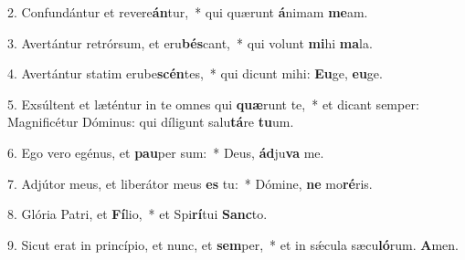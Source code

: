 2. Confundántur et revere\textbf{án}tur,~*  qui quærunt \textbf{á}nimam \textbf{me}am.\

3. Avertántur retrórsum, et eru\textbf{bés}cant,~*  qui volunt \textbf{mi}hi \textbf{ma}la.\

4. Avertántur statim erube\textbf{scén}tes,~*  qui dicunt mihi: \textbf{Eu}ge, \textbf{eu}ge.\

5. Exsúltent et læténtur in te omnes qui \textbf{quæ}runt te,~*  et dicant semper: Magnificétur Dóminus: qui díligunt salu\textbf{tá}re \textbf{tu}um.\

6. Ego vero egénus, et \textbf{pau}per sum:~*  Deus, \textbf{ád}ju\textbf{va} me.\

7. Adjútor meus, et liberátor meus \textbf{es} tu:~*  Dómine, \textbf{ne} mo\textbf{ré}ris.\

8. Glória Patri, et \textbf{Fí}lio,~*  et Spi\textbf{rí}tui \textbf{Sanc}to.\

9. Sicut erat in princípio, et nunc, et \textbf{sem}per,~*  et in sǽcula sæcu\textbf{ló}rum. \textbf{A}men.\

